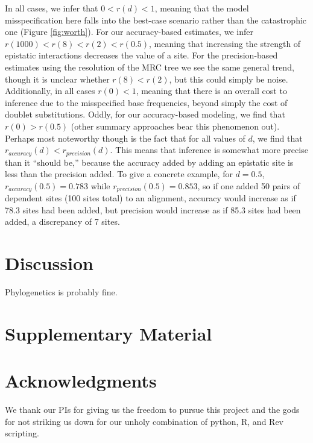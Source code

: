 \documentclass[11pt]{article}
\begin{document}
In all cases, we infer that $0 < r(d) < 1$, meaning that the model misspecification here falls into the best-case scenario rather than the catastrophic one (Figure \ref{fig:worth}).
For our accuracy-based estimates, we infer $r(1000) < r(8) < r(2) < r(0.5)$, meaning that increasing the strength of epistatic interactions decreases the value of a site.
For the precision-based estimates using the resolution of the MRC tree we see the same general trend, though it is unclear whether $r(8) < r(2)$, but this could simply be noise.
Additionally, in all cases $r(0) < 1$, meaning that there is an overall cost to inference due to the misspecified base frequencies, beyond simply the cost of doublet substitutions.
Oddly, for our accuracy-based modeling, we find that $r(0) > r(0.5)$ (other summary approaches bear this phenomenon out).
Perhaps most noteworthy though is the fact that for all values of $d$, we find that $r_{accuracy}(d) < r_{precision}(d)$.
This means that inference is somewhat more precise than it ``should be,'' because the accuracy added by adding an epistatic site is less than the precision added.
To give a concrete example, for $d = 0.5$, $r_{accuracy}(0.5) = 0.783$ while $r_{precision}(0.5) = 0.853$, so if one added 50 pairs of dependent sites (100 sites total) to an alignment, accuracy would increase as if 78.3 sites had been added, but precision would increase as if 85.3 sites had been added, a discrepancy of 7 sites.

\section*{Discussion\label{sec:discussion}}

Phylogenetics is probably fine.

\section*{Supplementary Material}


\section*{Acknowledgments}
We thank our PIs for giving us the freedom to pursue this project and the gods for not striking us down for our unholy combination of python, R, and Rev scripting.



\end{document}
